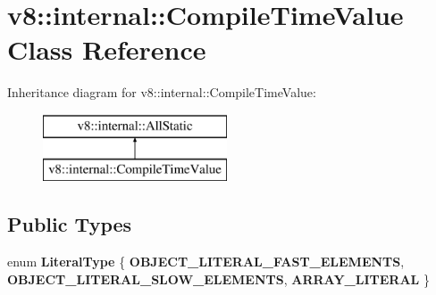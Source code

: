 \hypertarget{classv8_1_1internal_1_1_compile_time_value}{}\section{v8\+:\+:internal\+:\+:Compile\+Time\+Value Class Reference}
\label{classv8_1_1internal_1_1_compile_time_value}
Inheritance diagram for v8\+:\+:internal\+:\+:Compile\+Time\+Value\+:\begin{figure}[H]
\begin{center}
\leavevmode
\includegraphics[height=2.000000cm]{classv8_1_1internal_1_1_compile_time_value}
\end{center}
\end{figure}
\subsection*{Public Types}
\begin{DoxyCompactItemize}
\item 
\hypertarget{classv8_1_1internal_1_1_compile_time_value_a7a47587d35656f957544909d0b5e4fb5}{}enum {\bfseries Literal\+Type} \{ {\bfseries O\+B\+J\+E\+C\+T\+\_\+\+L\+I\+T\+E\+R\+A\+L\+\_\+\+F\+A\+S\+T\+\_\+\+E\+L\+E\+M\+E\+N\+T\+S}, 
{\bfseries O\+B\+J\+E\+C\+T\+\_\+\+L\+I\+T\+E\+R\+A\+L\+\_\+\+S\+L\+O\+W\+\_\+\+E\+L\+E\+M\+E\+N\+T\+S}, 
{\bfseries A\+R\+R\+A\+Y\+\_\+\+L\+I\+T\+E\+R\+A\+L}
 \}\label{classv8_1_1internal_1_1_compile_time_value_a7a47587d35656f957544909d0b5e4fb5}

\end{DoxyCompactItemize}
